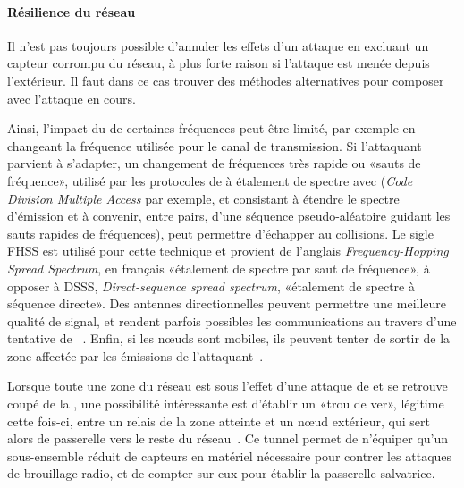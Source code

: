\paragraph{Résilience du réseau}
Il n'est pas toujours possible d'annuler les effets d'un attaque en excluant un capteur corrompu du réseau, à plus forte raison si l'attaque est menée depuis l'extérieur.
Il faut dans ce cas trouver des méthodes alternatives pour composer avec l'attaque en cours.

Ainsi, l'impact du  de certaines fréquences peut être limité, par exemple en changeant la fréquence utilisée pour le canal de transmission.
Si l'attaquant parvient à s'adapter, un changement de fréquences très rapide ou «sauts de fréquence», utilisé par les protocoles de  à étalement de spectre avec \cdma (\textit{Code Division Multiple Access} par exemple, et consistant à étendre le spectre d'émission et à convenir, entre pairs, d'une séquence pseudo-aléatoire guidant les sauts rapides de fréquences), peut permettre d'échapper au collisions.
Le sigle FHSS est utilisé pour cette technique et provient de l'anglais \textit{Frequency-Hopping Spread Spectrum}, en français «étalement de spectre par saut de fréquence», à opposer à DSSS, \textit{Direct-sequence spread spectrum}, \cad «étalement de spectre à séquence directe».
Des antennes directionnelles peuvent permettre une meilleure qualité de signal, et rendent parfois possibles les communications au travers d'une tentative de ~\cite{PI11}.
Enfin, si les nœuds sont mobiles, ils peuvent tenter de sortir de la zone affectée par les émissions de l'attaquant~\cite{PI11}.

Lorsque toute une zone du réseau est sous l'effet d'une attaque de  et se retrouve coupé de la \sdb, une possibilité intéressante est d'établir un «trou de ver», légitime cette fois-ci, entre un relais de la zone atteinte et un nœud extérieur, qui sert alors de passerelle vers le reste du réseau~\cite{CCH07}.
Ce tunnel permet de n'équiper qu'un sous-ensemble réduit de capteurs en matériel nécessaire pour contrer les attaques de brouillage radio, et de compter sur eux pour établir la passerelle salvatrice.

